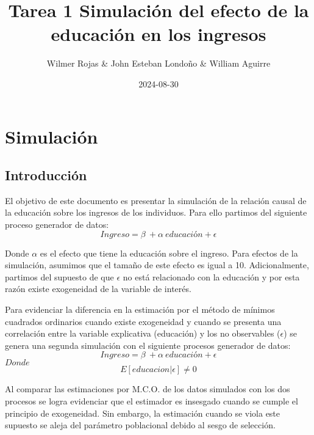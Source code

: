 \documentclass[
]{article}
\title{Tarea 1 Simulación del efecto de la educación en los ingresos}
\author{Wilmer Rojas \& John Esteban Londoño \& William Aguirre}
\date{2024-08-30}
\begin{document}
\maketitle

\section{Simulación}\label{simulaciuxf3n}

\subsection{Introducción}\label{introducciuxf3n}

El objetivo de este documento es presentar la simulación de la relación
causal de la educación sobre los ingresos de los individuos. Para ello
partimos del siguiente proceso generador de datos:
\[Ingreso= \beta\ +\alpha\ educación + \epsilon\]

Donde \(\alpha\) es el efecto que tiene la educación sobre el ingreso.
Para efectos de la simulación, asumimos que el tamaño de este efecto es
igual a 10. Adicionalmente, partimos del supuesto de que \(\epsilon\) no
está relacionado con la educación y por esta razón existe exogeneidad de
la variable de interés.

Para evidenciar la diferencia en la estimación por el método de mínimos
cuadrados ordinarios cuando existe exogeneidad y cuando se presenta una
correlación entre la variable explicativa (educación) y los no
observables (\(\epsilon\)) se genera una segunda simulación con el
siguiente procesos generador de datos:
\[Ingreso= \beta\ +\alpha\ educación + \epsilon\] \(Donde\)
\[E[educacion|\epsilon] \neq 0\]

Al comparar las estimaciones por M.C.O. de los datos simulados con los
dos procesos se logra evidenciar que el estimador es insesgado cuando se
cumple el principio de exogeneidad. Sin embargo, la estimación cuando se
viola este supuesto se aleja del parámetro poblacional debido al sesgo
de selección.
\end{document}
